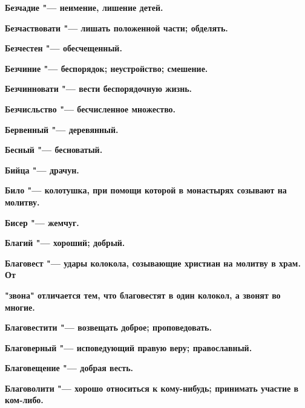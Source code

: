 \bfseries Безчадие \normalfont{} "--- неимение, лишение детей. 




\bfseries Безчаствовати \normalfont{} "--- лишать положенной части; обделять. 




\bfseries Безчестен \normalfont{} "--- обесчещенный. 




\bfseries Безчиние \normalfont{} "--- беспорядок; неустройство; смешение. 




\bfseries Безчинновати \normalfont{} "--- вести беспорядочную жизнь. 




\bfseries Безчисльство \normalfont{} "--- бесчисленное множество. 




\bfseries Бервенный \normalfont{} "--- деревянный. 




\bfseries Бесный \normalfont{} "--- бесноватый. 




\bfseries Бийца \normalfont{} "--- драчун. 




\bfseries Било \normalfont{} "--- колотушка, при помощи которой в монастырях созывают на молитву. 




\bfseries Бисер \normalfont{} "--- жемчуг. 




\bfseries Благий \normalfont{} "--- хороший; добрый. 




\bfseries Благовест \normalfont{} "--- удары колокола, созывающие христиан на молитву в храм. От 




\bfseries "звона" \normalfont{} отличается тем, что благовестят в один колокол, а звонят во многие. 




\bfseries Благовестити \normalfont{} "--- возвещать доброе; проповедовать. 




\bfseries Благоверный \normalfont{} "--- исповедующий правую веру; православный. 




\bfseries Благовещение \normalfont{} "--- добрая весть. 




\bfseries Благоволити \normalfont{} "--- хорошо относиться к кому-нибудь; принимать участие в ком-либо. 




